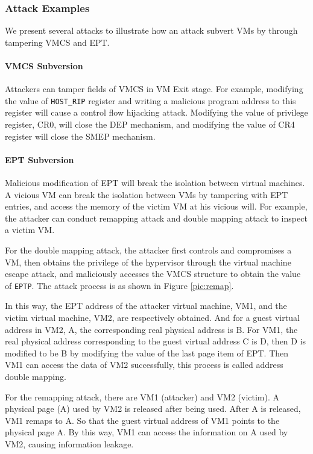 
\subsubsection{Attack Examples}
We present several attacks to illustrate how an attack subvert VMs by through tampering VMCS and EPT.

\paragraph{VMCS Subversion}
Attackers can tamper fields of VMCS in VM Exit stage. For example, modifying the value of \verb|HOST_RIP| register and writing a malicious program address to this register will cause a control flow hijacking attack. Modifying the value of privilege register, CR0, will close the DEP mechanism, and modifying the value of CR4 register will close the SMEP mechanism.


\paragraph{EPT Subversion}
Malicious modification of EPT will break the isolation between virtual machines. A vicious VM can break the isolation between VMs by tampering with EPT entries, and access the memory of the victim VM at his vicious will. For example, the attacker can conduct remapping attack and double mapping attack to inspect a victim VM. 

For the double mapping attack, the attacker first controls and compromises a VM, then obtains the privilege of the hypervisor through the virtual machine escape attack, and maliciously accesses the VMCS structure to obtain the value of \verb|EPTP|. The attack process is as shown in Figure \ref{pic:remap}. 

In this way, the EPT address of the attacker virtual machine, VM1, and the victim virtual machine, VM2, are respectively obtained. And for a guest virtual address in VM2, A, the corresponding real physical address is B. For VM1, the real physical address corresponding to the guest virtual address C is D, then D is modified to be B by modifying the value of the last page item of EPT. Then VM1 can access the data of VM2 successfully, this process is called address double mapping.

For the remapping attack, there are VM1 (attacker) and VM2 (victim). A physical page (A) used by VM2 is released after being used. After A is released, VM1 remaps to A. So that the guest virtual address of VM1 points to the physical page A. By this way, VM1 can access the information on A used by VM2, causing information leakage.


